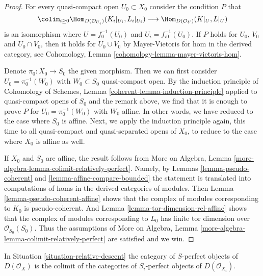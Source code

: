 \begin{proof}
For every quasi-compact open $U_0 \subset X_0$ consider the
condition $P$ that
$$
\colim_{i \geq 0} \Hom_{D(\mathcal{O}_{U_i})}(K_i|_{U_i}, L_i|_{U_i})
\longrightarrow
\Hom_{D(\mathcal{O}_U)}(K|_U, L|_U)
$$
is an isomorphism where $U = f_0^{-1}(U_0)$ and $U_i = f_{i0}^{-1}(U_0)$.
If $P$ holds for $U_0$, $V_0$ and $U_0 \cap V_0$, then it holds
for $U_0 \cup V_0$ by Mayer-Vietoris
for hom in the derived category, see
Cohomology, Lemma \ref{cohomology-lemma-mayer-vietoris-hom}.

\medskip\noindent
Denote $\pi_0 : X_0 \to S_0$ the given morphism.
Then we can first consider $U_0 = \pi_0^{-1}(W_0)$ with
$W_0 \subset S_0$ quasi-compact open. By the induction principle of
Cohomology of Schemes, Lemma \ref{coherent-lemma-induction-principle}
applied to quasi-compact opens of $S_0$
and the remark above, we find that it is enough to prove
$P$ for $U_0 = \pi_0^{-1}(W_0)$ with $W_0$ affine.
In other words, we have reduced to the case where $S_0$ is affine.
Next, we apply the induction principle again, this time to all
quasi-compact and quasi-separated opens of $X_0$, to reduce to the
case where $X_0$ is affine as well.

\medskip\noindent
If $X_0$ and $S_0$ are affine, the result follows from
More on Algebra, Lemma \ref{more-algebra-lemma-colimit-relatively-perfect}.
Namely, by Lemmas \ref{lemma-pseudo-coherent} and
\ref{lemma-affine-compare-bounded}
the statement is translated into computations of homs in the
derived categories of modules. Then
Lemma \ref{lemma-pseudo-coherent-affine}
shows that the complex of modules corresponding to $K_0$
is pseudo-coherent. And
Lemma \ref{lemma-tor-dimension-rel-affine}
shows that the complex of modules corresponding to $L_0$
has finite tor dimension over $\mathcal{O}_{S_0}(S_0)$.
Thus the assumptions of
More on Algebra, Lemma \ref{more-algebra-lemma-colimit-relatively-perfect}
are satisfied and we win.
\end{proof}

\begin{lemma}
\label{lemma-descend-relatively-perfect}
In Situation \ref{situation-relative-descent} the category of
$S$-perfect objects of $D(\mathcal{O}_X)$ is the colimit of the categories
of $S_i$-perfect objects of $D(\mathcal{O}_{X_i})$.
\end{lemma}

